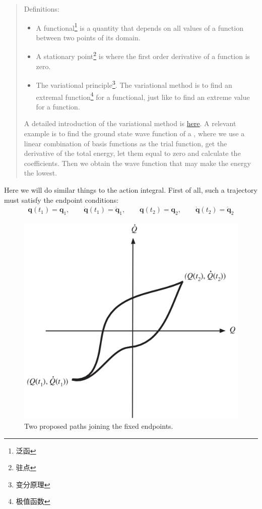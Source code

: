\documentclass[
  10pt,
  twoside,
  openany,
  b5paper, %
  colorscheme = bootstrap-v4, %
]{qyxf-book}
\numberwithin{equation}{section}
\newcommand{\vq}{\boldsymbol{q}}
\newcommand{\dvq}{\dot{\vq}}
\begin{document}
\begin{quote}
	Definitions:
	\begin{itemize}
		\item A functional\footnote{泛函} is a quantity that depends on all values of a function between two points of its domain.
		\item A stationary point\footnote{驻点} is where the first order derivative of a function is zero.
		\item The variational principle\footnote{变分原理}. The variational method is to find an extremal function\footnote{极值函数} for a functional, just like to find an extreme value for a function.
	\end{itemize}
	A detailed introduction of the variational method is \href{https://zhuanlan.zhihu.com/p/139018146}{here}. A relevant example is to find the ground state wave function of a , where we use a linear combination of basis functions as the trial function, get the derivative of the total energy, let them equal to zero and calculate the coefficients. Then we obtain the wave function that may make the energy the lowest.
\end{quote}

Here we will do similar things to the action integral. 
First of all, such a trajectory must satisfy the endpoint conditions:
\begin{gather}
	\vq(t_1)=\vq_1,\qquad \dvq(t_1)=\dvq_1,\qquad \vq(t_2)=\vq_2,\qquad \dvq(t_2)=\dvq_2
\end{gather}

\begin{figure}[htbp]
	\centering
	\includegraphics[width=0.6\linewidth]{figure/1-8-qt}
	\caption{Two proposed paths joining the fixed endpoints.}
	\label{fig:1-8-qt}
\end{figure}
\end{document}
